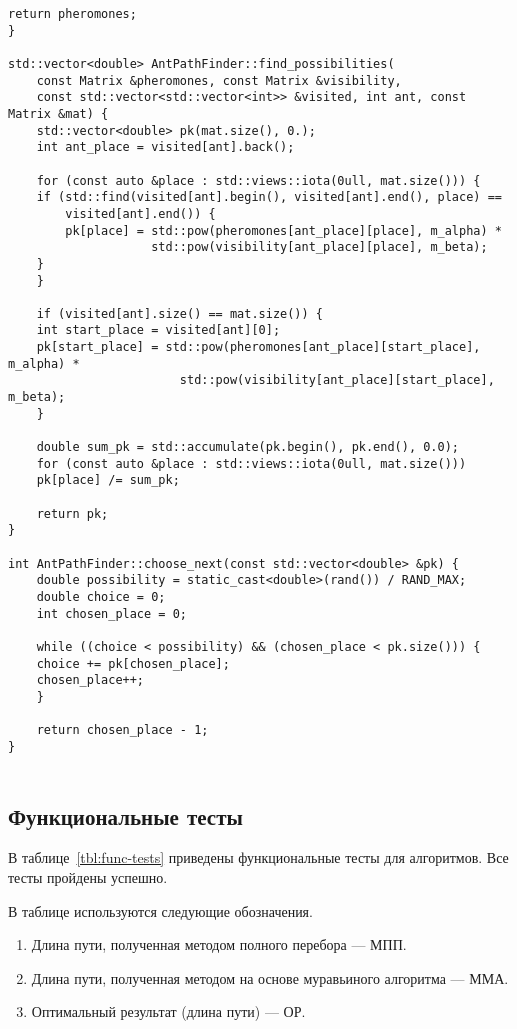 \begin{lstlisting}[caption={Реализация муравьиного алгоритма},label=lst:ant]
    return pheromones;
}

std::vector<double> AntPathFinder::find_possibilities(
    const Matrix &pheromones, const Matrix &visibility,
    const std::vector<std::vector<int>> &visited, int ant, const Matrix &mat) {
    std::vector<double> pk(mat.size(), 0.);
    int ant_place = visited[ant].back();

    for (const auto &place : std::views::iota(0ull, mat.size())) {
    if (std::find(visited[ant].begin(), visited[ant].end(), place) ==
        visited[ant].end()) {
        pk[place] = std::pow(pheromones[ant_place][place], m_alpha) *
                    std::pow(visibility[ant_place][place], m_beta);
    }
    }

    if (visited[ant].size() == mat.size()) {
    int start_place = visited[ant][0];
    pk[start_place] = std::pow(pheromones[ant_place][start_place], m_alpha) *
                        std::pow(visibility[ant_place][start_place], m_beta);
    }

    double sum_pk = std::accumulate(pk.begin(), pk.end(), 0.0);
    for (const auto &place : std::views::iota(0ull, mat.size()))
    pk[place] /= sum_pk;

    return pk;
}

int AntPathFinder::choose_next(const std::vector<double> &pk) {
    double possibility = static_cast<double>(rand()) / RAND_MAX;
    double choice = 0;
    int chosen_place = 0;

    while ((choice < possibility) && (chosen_place < pk.size())) {
    choice += pk[chosen_place];
    chosen_place++;
    }

    return chosen_place - 1;
}
    
\end{lstlisting}


\clearpage
\subsection{Функциональные тесты}

В таблице~\ref{tbl:func-tests} приведены функциональные тесты для алгоритмов. 
Все тесты пройдены успешно.

В таблице используются следующие обозначения.
\begin{enumerate}
    \item Длина пути, полученная методом полного перебора --- МПП.
    \item Длина пути, полученная методом на основе муравьиного алгоритма --- ММА.
    \item Оптимальный результат (длина пути) --- ОР.
\end{enumerate}

